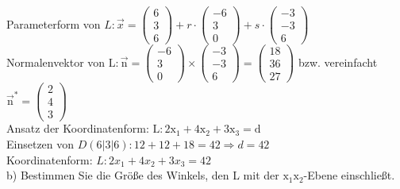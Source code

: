 \documentclass[10pt]{article}
\begin{document}
Parameterform von $L: \vec{x}=\left(\begin{array}{l}6 \\ 3 \\ 6\end{array}\right)+r \cdot\left(\begin{array}{c}-6 \\ 3 \\ 0\end{array}\right)+s \cdot\left(\begin{array}{c}-3 \\ -3 \\ 6\end{array}\right)$\\
Normalenvektor von $\mathrm{L}: \overrightarrow{\mathrm{n}}=\left(\begin{array}{c}-6 \\ 3 \\ 0\end{array}\right) \times\left(\begin{array}{c}-3 \\ -3 \\ 6\end{array}\right)=\left(\begin{array}{l}18 \\ 36 \\ 27\end{array}\right)$ bzw. vereinfacht $\overrightarrow{\mathrm{n}}^{*}=\left(\begin{array}{l}2 \\ 4 \\ 3\end{array}\right)$\\
Ansatz der Koordinatenform: $\mathrm{L}: 2 \mathrm{x}_{1}+4 \mathrm{x}_{2}+3 \mathrm{x}_{3}=\mathrm{d}$\\
Einsetzen von $D(6|3| 6): 12+12+18=42 \Rightarrow d=42$\\
Koordinatenform: $L: 2 x_{1}+4 x_{2}+3 x_{3}=42$\\
b) Bestimmen Sie die Größe des Winkels, den L mit der $\mathrm{x}_{1} \mathrm{x}_{2}$-Ebene einschließt.
\end{document}
